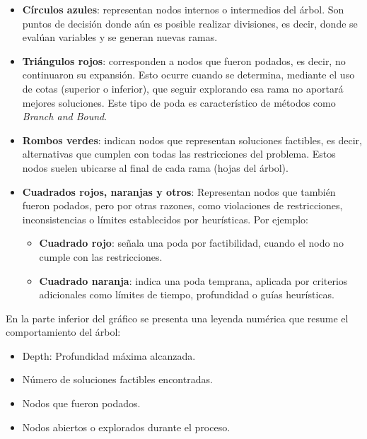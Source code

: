 \begin{itemize}
	\item \textbf{Círculos azules}: representan nodos internos o intermedios del árbol. Son puntos de decisión donde aún es posible realizar divisiones, es decir, donde se evalúan variables y se generan nuevas ramas.

	\item \textbf{Triángulos rojos}: corresponden a nodos que fueron podados, es decir, no continuaron su expansión. Esto ocurre cuando se determina, mediante el uso de cotas (superior o inferior), que seguir explorando esa rama no aportará mejores soluciones. Este tipo de poda es característico de métodos como \textit{Branch and Bound}.

	\item \textbf{Rombos verdes}: indican nodos que representan soluciones factibles, es decir, alternativas que cumplen con todas las restricciones del problema. Estos nodos suelen ubicarse al final de cada rama (hojas del árbol).

	\item \textbf{Cuadrados rojos, naranjas y otros}: Representan nodos que también fueron podados, pero por otras razones, como violaciones de restricciones, inconsistencias o límites establecidos por heurísticas. Por ejemplo:
	\begin{itemize}
		\item \textbf{Cuadrado rojo}: señala una poda por factibilidad, cuando el nodo no cumple con las restricciones.
		\item \textbf{Cuadrado naranja}: indica una poda temprana, aplicada por criterios adicionales como límites de tiempo, profundidad o guías heurísticas.
	\end{itemize}
\end{itemize}

En la parte inferior del gráfico se presenta una leyenda numérica que resume el comportamiento del árbol:

\begin{itemize}
	\item Depth: Profundidad máxima alcanzada.

	\item Número de soluciones factibles encontradas.

	\item Nodos que fueron podados.

	\item Nodos abiertos o explorados durante el proceso.
\end{itemize}

